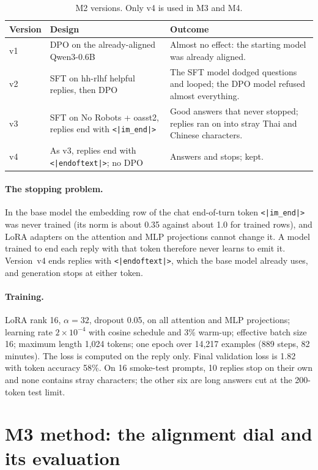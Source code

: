 \documentclass[11pt,a4paper]{article}
\begin{document}
\begin{table}[h]
  \centering
  \caption{M2 versions. Only v4 is used in M3 and M4.}
  \label{tab:m2}
  \begin{tabularx}{\linewidth}{lLL}
    \toprule
    Version & Design & Outcome \\
    \midrule
    v1 & DPO on the already-aligned Qwen3-0.6B & Almost no effect: the starting model was already aligned. \\
    v2 & SFT on hh-rlhf helpful replies, then DPO & The SFT model dodged questions and looped; the DPO model refused almost everything. \\
    v3 & SFT on No Robots + oasst2, replies end with \texttt{<|im\_end|>} & Good answers that never stopped; replies ran on into stray Thai and Chinese characters. \\
    v4 & As v3, replies end with \texttt{<|endoftext|>}; no DPO & Answers and stops; kept. \\
    \bottomrule
  \end{tabularx}
\end{table}

\paragraph{The stopping problem.} In the base model the embedding row of the chat end-of-turn token \texttt{<|im\_end|>} was never trained (its norm is about 0.35 against about 1.0 for trained rows), and LoRA adapters on the attention and MLP projections cannot change it. A model trained to end each reply with that token therefore never learns to emit it. Version~v4 ends replies with \texttt{<|endoftext|>}, which the base model already uses, and generation stops at either token.

\paragraph{Training.} LoRA rank 16, $\alpha=32$, dropout 0.05, on all attention and MLP projections; learning rate $2\times10^{-4}$ with cosine schedule and 3\% warm-up; effective batch size 16; maximum length 1{,}024 tokens; one epoch over 14{,}217 examples (889 steps, 82 minutes). The loss is computed on the reply only. Final validation loss is 1.82 with token accuracy 58\%. On 16 smoke-test prompts, 10 replies stop on their own and none contains stray characters; the other six are long answers cut at the 200-token test limit.

\section{M3 method: the alignment dial and its evaluation}
\label{sec:m3-method}
\end{document}
